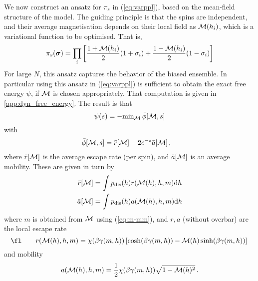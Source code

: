 \documentclass{iopart}
\newcommand{\dst}[0]{\ensuremath{\mathrm{d}}}
\newcommand{\mdis}[0]{\ensuremath{\mathcal{M}}}
\begin{document}
We now construct an ansatz for $\pi_s$ in (\ref{eq:varppl}), based on the mean-field structure of the model.  The guiding principle is that the spins are independent, and their average magnetisation depends on their local field as ${\cal M}(h_i)$, which is a variational function to be optimised.  That is,
\begin{equation}
\label{equ:pi_s_mf}
\pi_s(\bm{\sigma}) = \prod_i \left[ \frac{1+{\cal M}(h_i)}{2}(1+\sigma_i) + \frac{1-{\cal M}(h_i)}{2}(1-\sigma_i) \right]
\end{equation}
For large $N$, this ansatz captures the behavior of the biased ensemble.  In particular using this ansatz in (\ref{eq:varppl}) is sufficient to obtain the exact free energy $\psi$, if ${\cal M}$ is chosen appropriately.
That computation is given in \ref{app:dyn_free_energy}.  The result is that 
\begin{equation}
  \label{eq:21}
  {\psi}(s)  = -{\min}_{{\cal M}} \, \bar{\phi}[{\cal M}, s]
\end{equation}
with
\begin{eqnarray}
  \label{eq:22}
  \bar{\phi}[\mm,s] %
                      & = \bar{r}[\mm] - 2e^{-s}\bar{a}[\mm] \, , 
\end{eqnarray}
where $\bar{r}[{\cal M}]$ is the average escape rate (per spin), and $\bar{a}[{\cal M}]$ is an average mobility.
These are given in turn by
\begin{eqnarray}
  \label{eq:46}
     \bar{r}[\mm] & = \int \pdis(h) r(\mm(h), h, m) \dst h \nonumber \\
     \bar{a}[\mm] & = \int \pdis(h) a(\mm(h), h, m) \dst h
\end{eqnarray}
where $m$ is obtained from ${\cal M}$ using (\ref{eq:m-mm}), and $r,a$ (without overbar) are the local escape rate 
\begin{equation}
  \label{eq:14}
  \fl\qquad
  r(\mm (h),h, m) %
                  =  \chi(\beta \gamma(m,h)) \left[ \cosh(\beta \gamma(m,h)) - \mm(h)\sinh(\beta \gamma(m,h)) \right] \, 
\end{equation}
and mobility
\begin{equation}
  \label{eq:13}
  a(\mm (h),h, m) %
                    =  \frac{1}{2}\chi(\beta \gamma(m,h)) \sqrt{1-\mm(h)^{2}} \, . \\
\end{equation}
\end{document}
